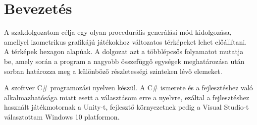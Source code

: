 \chapter*{Bevezetés}

A szakdolgozatom célja egy olyan procedurális generálási mód kidolgozása, amellyel izometrikus grafikájú játékokhoz változatos térképeket lehet előállítani. A térképek hexagon alapúak. A dolgozat azt a többlépcsős folyamatot mutatja be, amely során a program a nagyobb összefüggő egységek meghatározása után sorban határozza meg a különböző részletességi szinteken lévő elemeket.

A szoftver C\# programozási nyelven készül. A C\# ismerete és a fejlesztéshez való alkalmazhatósága miatt esett a választásom erre a nyelvre, ezáltal a fejlesztéshez használt játékmotornak a Unity-t, fejlesztő környezetnek pedig a Visual Studio-t választottam Windows 10 platformon.

